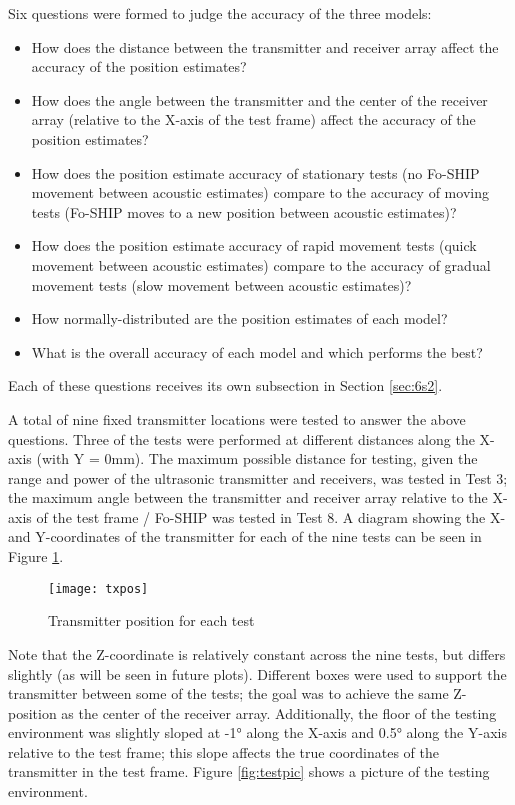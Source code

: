 \documentclass[11pt]{ucthesisCP}
\begin{document}
Six questions were formed to judge the accuracy of the three models:
\begin{itemize}[noitemsep,topsep=0pt,]
	\item How does the distance between the transmitter and receiver array affect the accuracy of the position estimates?
	\item How does the angle between the transmitter and the center of the receiver array (relative to the X-axis of the test frame) affect the accuracy of the position estimates?
	\item How does the position estimate accuracy of stationary tests (no Fo-SHIP movement between acoustic estimates) compare to the accuracy of moving tests (Fo-SHIP moves to a new position between acoustic estimates)?
	\item How does the position estimate accuracy of rapid movement tests (quick movement between acoustic estimates) compare to the accuracy of gradual movement tests (slow movement between acoustic estimates)?
	\item How normally-distributed are the position estimates of each model?
	\item What is the overall accuracy of each model and which performs the best?
\end{itemize}

Each of these questions receives its own subsection in Section \ref{sec:6s2}.

A total of nine fixed transmitter locations were tested to answer the above questions. Three of the tests were performed at different distances along the X-axis (with Y = 0mm). The maximum possible distance for testing, given the range and power of the ultrasonic transmitter and receivers, was tested in Test 3; the maximum angle between the transmitter and receiver array relative to the X-axis of the test frame / Fo-SHIP was tested in Test 8. A diagram showing the X- and Y-coordinates of the transmitter for each of the nine tests can be seen in Figure \ref{fig:txpos}.

\begin{figure}[htbp]
	\centering
	\texttt{[image: txpos]}
	\caption{Transmitter position for each test}
	\label{fig:txpos}
\end{figure}

Note that the Z-coordinate is relatively constant across the nine tests, but differs slightly (as will be seen in future plots). Different boxes were used to support the transmitter between some of the tests; the goal was to achieve the same Z-position as the center of the receiver array. Additionally, the floor of the testing environment was slightly sloped at -1° along the X-axis and 0.5° along the Y-axis relative to the test frame; this slope affects the true coordinates of the transmitter in the test frame. Figure \ref{fig:testpic} shows a picture of the testing environment.
\end{document}
